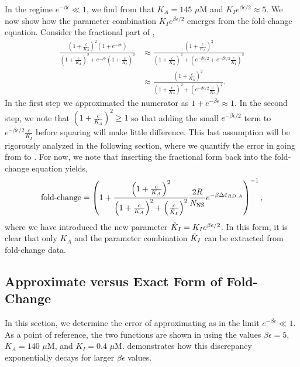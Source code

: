 In the regime $e^{- \beta \epsilon} \ll
1$, we find from \fref[SIfig5] that $K_A = 145\,\,\mu\text{M}$ and $K_I e^{\beta \epsilon/2} \approx 5$. We now show how the parameter combination $K_I e^{\beta \epsilon/2}$ emerges from the fold-change equation. Consider the fractional part of \eref[SIFullFoldChangeExpression],
\begin{align}
\frac{\left(1+\frac{c}{K_A}\right)^2 \left( 1 + e^{-\beta \epsilon} \right)}{\left(1+\frac{c}{K_A}\right)^2+e^{-\beta \epsilon}\left(1 + \frac{c}{K_I}\right)^2}
&\approx
\frac{\left(1+\frac{c}{K_A}\right)^2}{\left(1+\frac{c}{K_A}\right)^2+\left(e^{-\beta \epsilon/2} + e^{-\beta \epsilon/2}\frac{c}{K_I}\right)^2} \label{eqSIstep2}\\
&\approx
\frac{\left(1+\frac{c}{K_A}\right)^2}{\left(1+\frac{c}{K_A}\right)^2+\left( e^{-\beta \epsilon/2}\frac{c}{K_I}\right)^2}.\label{eqSIstep3}
\end{align}
In the first step we approximated the numerator as $1 + e^{-\beta \epsilon}
\approx 1$. In the second step, we note that $\left(1+\frac{c}{K_A}\right)^2 \ge
1$ so that adding the small $e^{-\beta \epsilon/2}$ term to $e^{-\beta
	\epsilon/2}\frac{c}{K_I}$ before squaring will make little difference. This last
assumption will be rigorously analyzed in the following section, where we
quantify the error in going from \eref[eqSIstep2] to \eref[eqSIstep3]. For now,
we note that inserting the fractional form \eref[eqSIstep3] back into the
fold-change equation \eref[SIFullFoldChangeExpression] yields,
\begin{equation} \label{SIFullFoldChangeExpressionSloppiless}
\operatorname{fold-change} = \left(
1+\frac{\left(1+\frac{c}{K_A}\right)^2}{\left(1+\frac{c}{K_A}\right)^2+\left(\frac{c}{\tilde{K}_I}\right)^2}\frac{2 R}{N_{\text{NS}}}e^{-\beta \Delta\tilde{\varepsilon}_{RD,A}} \right)^{-1},
\end{equation}
where we have introduced the new parameter $\tilde{K}_I = K_I e^{\beta \epsilon/2}$. In this form, it is clear that only $K_A$ and the parameter combination $\tilde{K}_I$ can be extracted from fold-change data.


\subsection{Approximate versus Exact Form of Fold-Change}

In this section, we determine the error of approximating \eref[eqSIstep2] as
\eref[eqSIstep3] in the limit $e^{- \beta \epsilon} \ll 1$. As a point of
reference, the two functions are shown in \fref[SIfig6] using the
values $\beta \epsilon = 5$, $K_A = 140\,\,\mu\text{M}$, and $K_I =
0.4\,\,\mu\text{M}$. \fref[SIfig6] demonstrates how this discrepancy
exponentially decays for larger $\beta \epsilon$ values.

